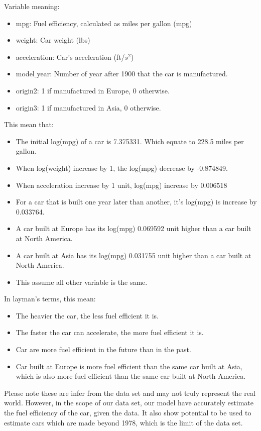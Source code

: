 Variable meaning:

\begin{itemize}
    \item mpg: Fuel efficiency, calculated as miles per gallon (mpg)
    \item weight: Car weight (lbs)
    \item acceleration: Car's acceleration (ft/$s^2$)
    \item model$\_$year: Number of year after 1900 that the car is manufactured.
    \item origin2: 1 if manufactured in Europe, 0 otherwise.
    \item origin3: 1 if manufactured in Asia, 0 otherwise.
\end{itemize}

This mean that:

\begin{itemize}
    \item The initial log(mpg) of a car is 7.375331. Which equate to 228.5 miles per gallon.
    \item When log(weight) increase by 1, the log(mpg) decrease by -0.874849.
    \item When acceleration increase by 1 unit, log(mpg) increase by 0.006518
    \item For a car that is built one year later than another, it's log(mpg) is increase by 0.033764.
    \item A car built at Europe has its log(mpg) 0.069592 unit higher than a car built at North America.
    \item A car built at Asia has its log(mpg) 0.031755 unit higher than a car built at North America.
    \item This assume all other variable is the same.
\end{itemize}

In layman's terms, this mean:

\begin{itemize}
    \item The heavier the car, the less fuel efficient it is.
    \item The faster the car can accelerate, the more fuel efficient it is.
    \item Car are more fuel efficient in the future than in the past.
    \item Car built at Europe is more fuel efficient than the same car built at Asia, which is also more fuel efficient than the same car built at North America.
\end{itemize}

Please note these are infer from the data set and may not truly represent the real world. However, in the scope of our data set, our model have accurately estimate the fuel efficiency of the car, given the data. It also show potential to be used to estimate cars which are made beyond 1978, which is the limit of the data set.